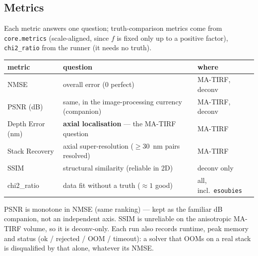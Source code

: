 \subsection{Metrics}
\label{sec:metrics}
Each metric answers one question; truth-comparison metrics come from \texttt{core.metrics}
(scale-aligned, since $f$ is fixed only up to a positive factor), \texttt{chi2\_ratio} from the
runner (it needs no truth).
\begin{center}
\begin{tabular}{lll}
\toprule
metric & question & where \\
\midrule
NMSE            & overall error ($0$ perfect) & MA-TIRF, deconv \\
PSNR (dB)       & same, in the image-processing currency (companion) & MA-TIRF, deconv \\
Depth Error (nm)& \textbf{axial localisation} --- the MA-TIRF question & MA-TIRF \\
Stack Recovery  & axial super-resolution ($\ge 30$~nm pairs resolved) & MA-TIRF \\
SSIM            & structural similarity (reliable in 2D) & deconv only \\
chi2\_ratio     & data fit without a truth ($\approx 1$ good) & all, incl.\ \texttt{esoubies} \\
\bottomrule
\end{tabular}
\end{center}
PSNR is monotone in NMSE (same ranking) --- kept as the familiar dB companion, not an
independent axis. SSIM is unreliable on the anisotropic MA-TIRF volume, so it is deconv-only.
Each run also records runtime, peak memory and status (ok / rejected / OOM / timeout): a solver
that OOMs on a real stack is disqualified by that alone, whatever its NMSE.
